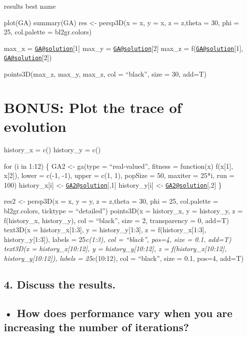 \documentclass[]{article}
\begin{document}
results best name

plot(GA) summary(GA) res \textless- persp3D(x = x, y = x, z = z,theta =
30, phi = 25, col.palette = bl2gr.colors)

max\_x = \href{mailto:GA@solution}{\nolinkurl{GA@solution}}{[}1{]}
max\_y = \href{mailto:GA@solution}{\nolinkurl{GA@solution}}{[}2{]}
max\_z = f(\href{mailto:GA@solution}{\nolinkurl{GA@solution}}{[}1{]},
\href{mailto:GA@solution}{\nolinkurl{GA@solution}}{[}2{]})

points3D(max\_z, max\_y, max\_z, col = ``black'', size = 30, add=T)

\hypertarget{bonus-plot-the-trace-of-evolution}{%
\section{BONUS: Plot the trace of
evolution}\label{bonus-plot-the-trace-of-evolution}}

history\_x = c() history\_y = c()

for (i in 1:12) \{ GA2 \textless- ga(type = ``real-valued'', fitness =
function(x) f(x{[}1{]}, x{[}2{]}), lower = c(-1, -1), upper = c(1, 1),
popSize = 50, maxiter = 25*i, run = 100) history\_x{[}i{]} \textless-
\href{mailto:GA2@solution}{\nolinkurl{GA2@solution}}{[},1{]}
history\_y{[}i{]} \textless-
\href{mailto:GA2@solution}{\nolinkurl{GA2@solution}}{[},2{]} \}

res2 \textless- persp3D(x = x, y = y, z = z,theta = 30, phi = 25,
col.palette = bl2gr.colors, ticktype = ``detailed'') points3D(x =
history\_x, y = history\_y, z = f(history\_x, history\_y), col =
``black'', size = 2, transparency = 0, add=T) text3D(x =
history\_x{[}1:3{]}, y = history\_y{[}1:3{]}, z = f(history\_x{[}1:3{]},
history\_y{[}1:3{]}), labels = 25\emph{c(1:3), col = ``black'', pos=4,
size = 0.1, add=T) text3D(x = history\_x{[}10:12{]}, y =
history\_y{[}10:12{]}, z = f(history\_x{[}10:12{]},
history\_y{[}10:12{]}), labels = 25}c(10:12), col = ``black'', size =
0.1, pos=4, add=T)

\hypertarget{discuss-the-results.}{%
\subsection{4. Discuss the results.}\label{discuss-the-results.}}

\hypertarget{how-does-performance-vary-when-you-are-increasing-the-number-of-iterations}{%
\subsection{• How does performance vary when you are increasing the
number of
iterations?}\label{how-does-performance-vary-when-you-are-increasing-the-number-of-iterations}}
\end{document}
